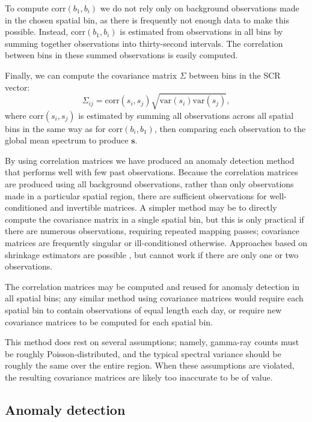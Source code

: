 To compute \(\text{corr}(b_1,b_i)\) we do not rely only on background
observations made in the chosen spatial bin, as there is frequently not enough
data to make this possible. Instead, \(\text{corr}(b_1,b_i)\) is estimated from
observations in all bins by summing together observations into thirty-second
intervals. The correlation between bins in these summed observations is easily
computed.

Finally, we can compute the covariance matrix \(\Sigma\) between bins in the SCR
vector:
\begin{equation}
\Sigma_{ij} = \text{corr} (s_i, s_j) \sqrt{\text{var}(s_i) \text{var}(s_j)},
\end{equation}
where \(\text{corr} (s_i, s_j)\) is estimated by summing all observations across
all spatial bins in the same way as for \(\text{corr}(b_i,b_1)\), then comparing
each observation to the global mean spectrum to produce \(\mathbf{s}\).


By using correlation matrices we have produced an anomaly detection method that
performs well with few past observations. Because the correlation matrices are
produced using all background observations, rather than only observations made
in a particular spatial region, there are sufficient observations for
well-conditioned and invertible matrices. A simpler method may be to directly
compute the covariance matrix in a single spatial bin, but this is only
practical if there are numerous observations, requiring repeated mapping passes;
covariance matrices are frequently singular or ill-conditioned
otherwise. Approaches based on shrinkage estimators are possible
\cite{Daniels:2001et}, but cannot work if there are only one or two
observations.

The correlation matrices may be computed and reused for anomaly detection in all
spatial bins; any similar method using covariance matrices would require each
spatial bin to contain observations of equal length each day, or require new
covariance matrices to be computed for each spatial bin. 

This method does rest on several assumptions; namely, gamma-ray counts must be
roughly Poisson-distributed, and the typical spectral variance should be roughly
the same over the entire region. When these assumptions are violated, the
resulting covariance matrices are likely too inaccurate to be of value.

\subsection{Anomaly detection}

